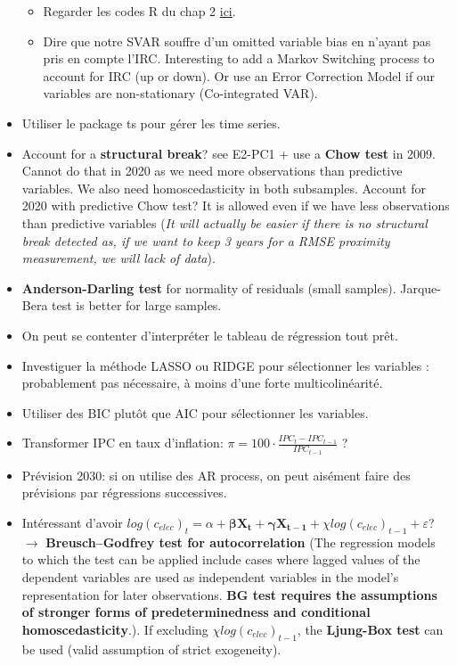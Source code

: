 \begin{itemize}
\begin{itemize}
    \item Regarder les codes R du chap 2 \href{https://www.dropbox.com/scl/fo/5wj88417eeloxca22qk0b/ACA2WKJ9yp2t9NGVqWXIiks?dl=0&e=1&rlkey=yjyfxpotil48wx9hh4xkdiq68}{ici}.
    \item Dire que notre SVAR souffre d'un omitted variable bias en n'ayant pas pris en compte l'IRC. Interesting to add a Markov Switching process to account for IRC (up or down). Or use an Error Correction Model if our variables are non-stationary (Co-integrated VAR).
\end{itemize}
\item Utiliser le package ts pour gérer les time series.
\item Account for a \textbf{structural break}? see E2-PC1 + use a \textbf{Chow test} in 2009. Cannot do that in 2020 as we need more observations than predictive variables. We also need homoscedasticity in both subsamples. Account for 2020 with predictive Chow test? It is allowed even if we have less observations than predictive variables (\textit{It will actually be easier if there is no structural break detected as, if we want to keep 3 years for a RMSE proximity measurement, we will lack of data}).
\item \textbf{Anderson-Darling test} for normality of residuals (small samples). Jarque-Bera test is better for large samples. 
\item On peut se contenter d'interpréter le tableau de régression tout prêt.
\item Investiguer la méthode LASSO ou RIDGE pour sélectionner les variables : probablement pas nécessaire, à moins d'une forte multicolinéarité. 
\item Utiliser des BIC plutôt que AIC pour sélectionner les variables.
\item Transformer IPC en taux d'inflation: $\pi = 100 \cdot \frac{IPC_t - IPC_{t-1}}{IPC_{t-1}}$ ?
\item Prévision 2030: si on utilise des AR process, on peut aisément faire des prévisions par régressions successives.
\item Intéressant d'avoir $log(c_{elec})_t = \alpha + \boldsymbol{\beta X_t} + \boldsymbol{\gamma X_{t-1}} + {\chi log(c_{elec})_{t-1}} + \varepsilon$? $\to$ \textbf{Breusch–Godfrey test for autocorrelation} (The regression models to which the test can be applied include cases where lagged values of the dependent variables are used as independent variables in the model's representation for later observations. \textbf{BG test requires the assumptions of stronger forms of predeterminedness and conditional homoscedasticity}.). If excluding $\chi log(c_{elec})_{t-1}$, the \textbf{Ljung-Box test} can be used (valid assumption of strict exogeneity).
\end{itemize}

